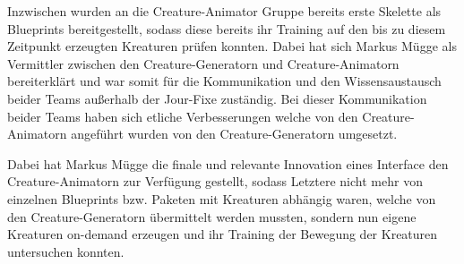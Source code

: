 Inzwischen wurden an die Creature-Animator Gruppe bereits erste Skelette als Blueprints bereitgestellt, sodass diese bereits ihr Training auf den bis zu diesem Zeitpunkt erzeugten Kreaturen prüfen konnten. Dabei hat sich Markus Mügge als Vermittler zwischen den Creature-Generatorn und Creature-Animatorn bereiterklärt und war somit für die Kommunikation und den Wissensaustausch beider Teams außerhalb der Jour-Fixe zuständig. Bei dieser Kommunikation beider Teams haben sich etliche Verbesserungen welche von den Creature-Animatorn angeführt wurden von den Creature-Generatorn umgesetzt. 

Dabei hat Markus Mügge die finale und relevante Innovation eines Interface den Creature-Animatorn zur Verfügung gestellt, sodass Letztere nicht mehr von einzelnen Blueprints bzw. Paketen mit Kreaturen abhängig waren, welche von den Creature-Generatorn übermittelt werden mussten, sondern nun eigene Kreaturen on-demand erzeugen und ihr Training der Bewegung der Kreaturen untersuchen konnten.



